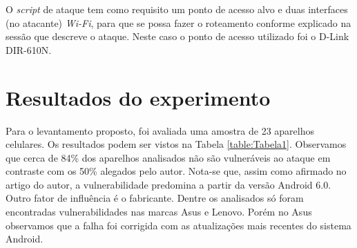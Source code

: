 \documentclass[12pt]{article}
\begin{document}
O \textit{script} de ataque tem como requisito um ponto de acesso alvo e duas interfaces (no atacante) \textit{Wi-Fi}, para que se possa fazer o roteamento conforme explicado na sessão que descreve o ataque. Neste caso o ponto de acesso utilizado foi o D-Link DIR-610N.


\section{Resultados do experimento}
Para o levantamento proposto, foi avaliada uma amostra de 23 aparelhos celulares. Os resultados podem ser vistos na Tabela \ref{table:Tabela1}. Observamos que cerca de 84\% dos aparelhos analisados não são vulneráveis ao ataque em contraste com os 50\% alegados pelo autor. Nota-se que, assim como afirmado no artigo do autor, a vulnerabilidade predomina a partir da versão Android 6.0. Outro fator de influência é o fabricante. Dentre os analisados só foram encontradas vulnerabilidades nas marcas Asus e Lenovo. Porém no Asus observamos que a falha foi corrigida com as atualizações mais recentes do sistema Android. 
\end{document}
